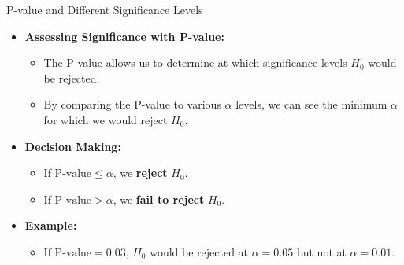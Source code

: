 \documentclass[handout]{beamer} %
\begin{document}
\begin{frame}{P-value and Different Significance Levels}
    \begin{itemize}
        \item \textbf{Assessing Significance with P-value:}
        \begin{itemize}
            \item The P-value allows us to determine at which significance levels \( H_0 \) would be rejected.
            \item By comparing the P-value to various \( \alpha \) levels, we can see the minimum \( \alpha \) for which we would reject \( H_0 \).
        \end{itemize}
        \item \textbf{Decision Making:}
        \begin{itemize}
            \item If \( \text{P-value} \leq \alpha \), we \textbf{reject} \( H_0 \).
            \item If \( \text{P-value} > \alpha \), we \textbf{fail to reject} \( H_0 \).
        \end{itemize}
        \item \textbf{Example:}
        \begin{itemize}
            \item If \( \text{P-value} = 0.03 \), \( H_0 \) would be rejected at \( \alpha = 0.05 \) but not at \( \alpha = 0.01 \).
        \end{itemize}
    \end{itemize}
\end{frame}
\end{document}
